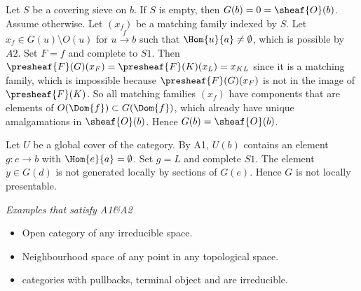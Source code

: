 Let $S$ be a covering sieve on $b$. If $S$ is empty, then $G(b) = 0 = \sheaf{O}(b)$.
Assume otherwise.
Let $(x_f)$ be a matching family indexed by $S$.
Let $x_f\in G(u)\setminus O(u)$ for $u\xrightarrow{f} b$ such that $\Hom{u}{a} \neq \emptyset$, 
which is possible by $A2$. Set $F=f$ and complete to $S1$. Then $\presheaf{F}(G)(x_F)= \presheaf{F}(K)(x_L) = x_{KL}$ since it is a matching family,
which is impossible because $\presheaf{F}(G)(x_F)$ is not in the image of $\presheaf{F}(K)$.
So all matching families $(x_f)$ have components that are elements of $O(\Dom{f})\subset G(\Dom{f})$, 
which already have unique amalgamations in $\sheaf{O}(b)$. 
Hence $G(b)= \sheaf{O}(b)$.

Let $U$ be a global cover of the category.
By A1, $U(b)$ contains an element $g:e\rightarrow b$ with $\Hom{e}{a} = \emptyset$.
Set $g=L$ and complete $S1$.
The element $y\in G(d)$ is not generated locally by sections of $G(e)$.
Hence $G$ is not locally presentable.

\emph{Examples that satisfy A1\&A2}
\begin{itemize}
\item Open category of any irreducible space.
\item Neighbourhood space of any point in any topological space.
\item categories with pullbacks, terminal object and are irreducible.
\end{itemize}
